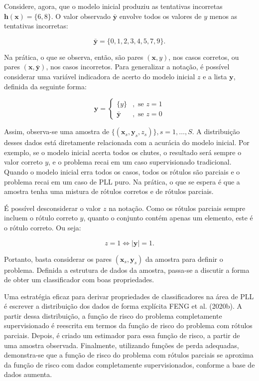 \documentclass[12pt,twoside,brazilian]{book}
\begin{document}
Considere, agora, que o modelo inicial produziu as tentativas incorretas
\(\mathbf h(\mathbf x) = \{6,8\}\). O valor observado
\(\bar{\mathbf y}\) envolve todos os valores de \(y\) menos as
tentativas incorretas:

\[
\bar{\mathbf y} = \{0,1,2,3,4,5,7,9\}.
\]

Na prática, o que se observa, então, são pares \((\mathbf x,y)\), nos
casos corretos, ou pares \((\mathbf x,\bar{\mathbf y})\), nos casos
incorretos. Para generalizar a notação, é possível considerar uma
variável indicadora de acerto do modelo inicial \(z\) e a lista
\(\mathbf y\), definida da seguinte forma:

\[
\mathbf y = \left\{\begin{array}{cl}\{y\}&,\text{ se }z=1\\\bar{\mathbf y}&,\text{ se }z=0\end{array}\right.
\]

Assim, observa-se uma amostra de
\(\{(\mathbf x_s,\mathbf y_s, z_s)\}, s = 1,\dots,S\). A distribuição
desses dados está diretamente relacionada com a acurácia do modelo
inicial. Por exemplo, se o modelo inicial acerta todos os chutes, o
resultado será sempre o valor correto \(y\), e o problema recai em um
caso supervisionado tradicional. Quando o modelo inicial erra todos os
casos, todos os rótulos são parciais e o problema recai em um caso de
PLL puro. Na prática, o que se espera é que a amostra tenha uma mistura
de rótulos corretos e de rótulos parciais.

É possível desconsiderar o valor \(z\) na notação. Como os rótulos
parciais sempre incluem o rótulo correto \(y\), quanto o conjunto contém
apenas um elemento, este é o rótulo correto. Ou seja:

\[
z=1 \iff |\mathbf y|=1.
\]

Portanto, basta considerar os pares \((\mathbf x_s, \mathbf y_s)\) da
amostra para definir o problema. Definida a estrutura de dados da
amostra, passa-se a discutir a forma de obter um classificador com boas
propriedades.

Uma estratégia eficaz para derivar propriedades de classificadores na
área de PLL é escrever a distribuição dos dados de forma explícita FENG
et al. (2020b). A partir dessa distribuição, a função de risco do
problema completamente supervisionado é reescrita em termos da função de
risco do problema com rótulos parciais. Depois, é criado um estimador
para essa função de risco, a partir de uma amostra observada.
Finalmente, utilizando funções de perda adequadas, demonstra-se que a
função de risco do problema com rótulos parciais se aproxima da função
de risco com dados completamente supervisionados, conforme a base de
dados aumenta.
\end{document}
